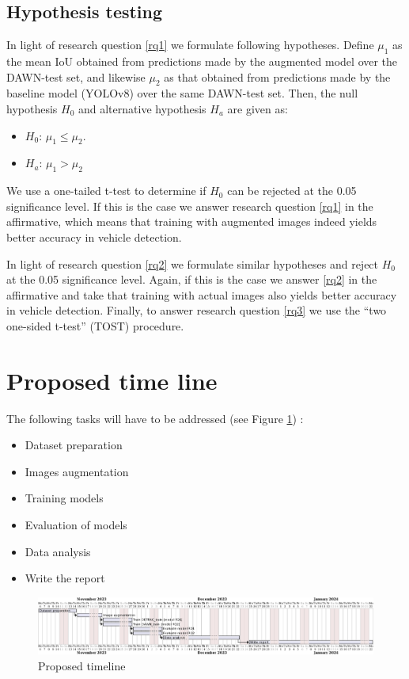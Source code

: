 \documentclass[]{article}
\begin{document}
\subsection{Hypothesis testing}
	
	In light of research question \ref{rq1} we formulate following hypotheses. Define $\mu_1$ as the mean IoU obtained from predictions made by the augmented model over the DAWN-test set, and likewise $\mu_2$ as that obtained from predictions made by the baseline model (YOLO{\small v8}) over the same DAWN-test set. Then, the null hypothesis $H_0$ and alternative hypothesis $H_a$ are given as:
	
	\begin{itemize}
		\item $H_0$: $\mu_1 \le \mu_2$. 
		\item $H_a$: $\mu_1 > \mu_2$
	\end{itemize}
	
	We use a one-tailed t-test to determine if $H_0$ can be rejected at the 0.05 significance level. If this is the case we answer research question \ref{rq1} in the affirmative, which means that training with augmented images indeed yields better accuracy in vehicle detection. 
	
	In light of research question \ref{rq2} we formulate similar hypotheses and reject $H_0$ at the 0.05 significance level. Again, if this is the case we answer \ref{rq2} in the affirmative and take that training with actual images also yields better accuracy in vehicle detection.
	Finally, to answer research question \ref{rq3} we use the ``two one-sided t-test'' (TOST) procedure.

\section{Proposed time line}

The following tasks will have to be addressed (see Figure \ref{fig:timeline}) :
\begin{itemize}
	\item Dataset preparation
	\item Images augmentation
	\item Training models
	\item Evaluation of models
	\item Data analysis
	\item Write the report
\end{itemize}

\begin{figure}[H]
	\centering
	\includegraphics[width=\textwidth]{proposal-timing}
	\caption{Proposed timeline}
	\label{fig:timeline}
\end{figure}

\printbibliography
\end{document}
